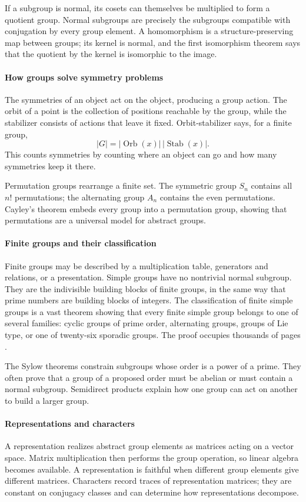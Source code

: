 If a subgroup is normal, its cosets can themselves be multiplied to form a quotient group. Normal subgroups are precisely the subgroups compatible with conjugation by every group element. A homomorphism is a structure-preserving map between groups; its kernel is normal, and the first isomorphism theorem says that the quotient by the kernel is isomorphic to the image.

\paragraph{How groups solve symmetry problems}
The symmetries of an object act on the object, producing a group action. The orbit of a point is the collection of positions reachable by the group, while the stabilizer consists of actions that leave it fixed. Orbit-stabilizer says, for a finite group,
\[
|G|=|\operatorname{Orb}(x)|\,|\operatorname{Stab}(x)|.
\]
This counts symmetries by counting where an object can go and how many symmetries keep it there.

Permutation groups rearrange a finite set. The symmetric group $S_n$ contains all $n!$ permutations; the alternating group $A_n$ contains the even permutations. Cayley's theorem embeds every group into a permutation group, showing that permutations are a universal model for abstract groups.

\paragraph{Finite groups and their classification}
Finite groups may be described by a multiplication table, generators and relations, or a presentation. Simple groups have no nontrivial normal subgroup. They are the indivisible building blocks of finite groups, in the same way that prime numbers are building blocks of integers. The classification of finite simple groups is a vast theorem showing that every finite simple group belongs to one of several families: cyclic groups of prime order, alternating groups, groups of Lie type, or one of twenty-six sporadic groups. The proof occupies thousands of pages \cite{group_theory_ref2}.

The Sylow theorems constrain subgroups whose order is a power of a prime. They often prove that a group of a proposed order must be abelian or must contain a normal subgroup. Semidirect products explain how one group can act on another to build a larger group.

\paragraph{Representations and characters}
A representation realizes abstract group elements as matrices acting on a vector space. Matrix multiplication then performs the group operation, so linear algebra becomes available. A representation is faithful when different group elements give different matrices. Characters record traces of representation matrices; they are constant on conjugacy classes and can determine how representations decompose.

